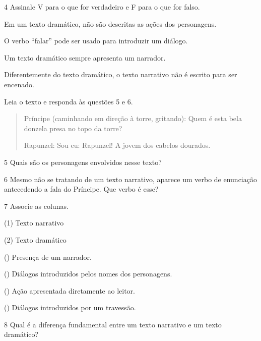 
\num{4} Assinale V para o que for verdadeiro e F para o que for falso.

\begin{boxlist}
 Em um texto dramático, não são descritas as ações dos personagens.

 O verbo “falar” pode ser usado para introduzir um diálogo.

 Um texto dramático sempre apresenta um narrador.

 Diferentemente do texto dramático, o texto narrativo não é escrito para ser encenado.
\end{boxlist}

Leia o texto e responda às questões 5 e 6.

\begin{quote}
Príncipe (caminhando em direção à torre, gritando): Quem é esta bela
donzela presa no topo da torre?

Rapunzel: Sou eu: Rapunzel! A jovem dos cabelos dourados.

\end{quote}

\num{5} Quais são os personagens envolvidos nesse texto?


\num{6} Mesmo não se tratando de um texto narrativo, aparece um verbo de enunciação antecedendo a fala do Príncipe. Que verbo é esse?


\num{7} Associe as colunas.

{\setlength{\columnsep}{-5cm}
\begin{multicols}{2}
(1) Texto narrativo

(2) Texto dramático

\columnbreak

({}) Presença de um narrador.

({}) Diálogos introduzidos pelos nomes dos personagens.

({}) Ação apresentada diretamente ao leitor.

({}) Diálogos introduzidos por um travessão.
\end{multicols}
}

\pagebreak
\num{8} Qual é a diferença fundamental entre um texto narrativo e um texto dramático?

